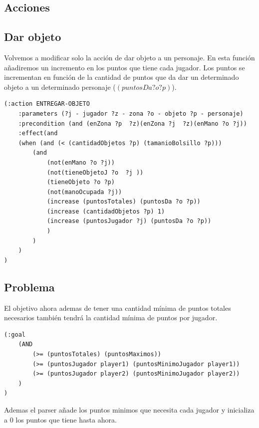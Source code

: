 \documentclass[12pt,a4paper]{article}
\begin{document}
\subsection{Acciones} 
\subsection{Dar objeto}
Volvemos a modificar solo la acción de dar objeto a un personaje. En esta función añadiremos un incremento en los puntos que tiene cada jugador. Los puntos se incrementan en función de la cantidad de puntos que da dar un determinado objeto a un determinado personaje ($(puntosDa ?o ?p)$).
\begin{lstlisting}
(:action ENTREGAR-OBJETO
	:parameters (?j - jugador ?z - zona ?o - objeto ?p - personaje)
	:precondition (and (enZona ?p  ?z)(enZona ?j  ?z)(enMano ?o ?j))
	:effect(and 
	(when (and (< (cantidadObjetos ?p) (tamanioBolsillo ?p)))
		(and
			(not(enMano ?o ?j))
			(not(tieneObjetoJ ?o  ?j ))
			(tieneObjeto ?o ?p)
			(not(manoOcupada ?j))
			(increase (puntosTotales) (puntosDa ?o ?p))
			(increase (cantidadObjetos ?p) 1)
			(increase (puntosJugador ?j) (puntosDa ?o ?p))
			)
		)
	)
)
\end{lstlisting}

\subsection{Problema}
El objetivo ahora ademas de tener una cantidad mínima de puntos totales necesarios también tendrá la cantidad mínima de puntos por jugador. 
\begin{lstlisting}
(:goal 
	(AND 
		(>= (puntosTotales) (puntosMaximos))
		(>= (puntosJugador player1) (puntosMinimoJugador player1))
		(>= (puntosJugador player2) (puntosMinimoJugador player2))
	)
)
\end{lstlisting}
Ademas el parser añade los puntos minimos que necesita cada jugador y inicializa a 0 los puntos que tiene hasta ahora. 
\end{document}
